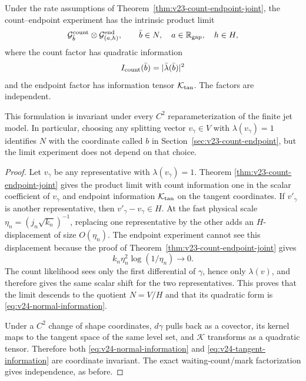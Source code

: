 \begin{theorem}
\label{thm:v24-coordinate-free-count-endpoint}
Under the rate assumptions of
Theorem~\ref{thm:v23-count-endpoint-joint}, the count--endpoint experiment has
the intrinsic product limit
\begin{equation}\label{eq:v24-intrinsic-product}
 \mathcal G^{\rm count}_{\bar b}
 \otimes
 \mathcal G^{\rm end}_{(a,h)},
 \qquad
 \bar b\in N,\quad a\in\mathbb R_{\rm gap},\quad h\in H,
\end{equation}
where the count factor has quadratic information
\begin{equation}\label{eq:v24-normal-information}
 I_{\rm count}(\bar b)=|\bar\lambda(\bar b)|^2
\end{equation}
and the endpoint factor has information tensor
\(\mathcal K_{\rm tan}\).  The factors are independent.

This formulation is invariant under every \(C^2\) reparameterization of the
finite jet model.  In particular, choosing any splitting vector
\(v_\gamma\in V\) with \(\lambda(v_\gamma)=1\) identifies \(N\) with the
coordinate called \(b\) in Section~\ref{sec:v23-count-endpoint}, but the limit
experiment does not depend on that choice.
\end{theorem}

\begin{proof}
Let \(v_\gamma\) be any representative with
\(\lambda(v_\gamma)=1\).  Theorem
\ref{thm:v23-count-endpoint-joint} gives the product limit with count
information one in the scalar coefficient of \(v_\gamma\) and endpoint
information \(\mathcal K_{\rm tan}\) on the tangent coordinates.  If
\(v'_\gamma\) is another representative, then
\(v'_\gamma-v_\gamma\in H\).  At the fast physical scale
\(\eta_n=(j_n\sqrt{k_n})^{-1}\), replacing one representative by the other
adds an \(H\)-displacement of size \(O(\eta_n)\).  The endpoint experiment
cannot see this displacement because the proof of
Theorem~\ref{thm:v23-count-endpoint-joint} gives
\[
 k_n\eta_n^2\log(1/\eta_n)\longrightarrow0.
\]
The count likelihood sees only the first differential of \(\gamma\), hence
only \(\lambda(v)\), and therefore gives the same scalar shift for the two
representatives.  This proves that the limit descends to the quotient
\(N=V/H\) and that its quadratic form is
\eqref{eq:v24-normal-information}.

Under a \(C^2\) change of shape coordinates, \(d\gamma\) pulls back as a
covector, its kernel maps to the tangent space of the same level set, and
\(\mathcal K\) transforms as a quadratic tensor.  Therefore both
\eqref{eq:v24-normal-information} and
\eqref{eq:v24-tangent-information} are coordinate invariant.  The exact
waiting-count/mark factorization gives independence, as before.
\end{proof}

